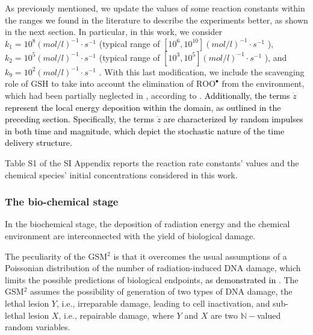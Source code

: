 \documentclass[10pt]{iopart}
\newcommand{\fra}[1]{\textcolor{black}{#1}}
\newcommand{\ema}[1]{\textcolor{black}{#1}}
\numberwithin{table}{section}
\begin{document}
As previously mentioned, we update the values of some reaction constants within the ranges we found in the literature to describe the experiments better, as shown in the next section. In particular, in this work, we consider $k_{1} = 10^8 (mol/l)^{-1} \cdot s^{-1}$ (typical range of $[10^6, 10^{10}] (mol/l)^{-1} \cdot s^{-1}$ \cite{Labarbe2020, Spitz2019, Neta1990, Epp1976, Michael1986}), $k_{2} = 10^5 (mol/l)^{-1} \cdot s^{-1}$ (typical range of $[10^3, 10^5] (mol/l)^{-1} \cdot s^{-1}$ \cite{Labarbe2020, Riahi2010}), and $k_{9} = 10^2 (mol/l)^{-1} \cdot s^{-1}$ \cite{Spitz2019, Wardman2020}. With this last modification, we include the scavenging role of $\mathrm{GSH}$ to take into account the elimination of $\mathrm{ROO^\bullet}$ from the environment, which had been partially neglected in \cite{Labarbe2020}, according to \cite{Wardman2020, Tan2023}. \fra{Additionally, the terms $\dot{z}$ represent the \ema{local} energy deposition within the domain, as outlined in the preceding section. Specifically, the terms $\dot{z}$ are characterized by random impulses in both time and magnitude, which depict the stochastic nature of the time delivery structure.}

Table S1 of the SI Appendix reports the reaction rate constants' values and the chemical species' initial concentrations considered in this work.

\subsubsection*{The bio-chemical stage}

In the biochemical stage, the deposition of radiation energy and the chemical environment are interconnected with the yield of biological damage.

The peculiarity of the GSM$^2$ is that it overcomes the usual assumptions of a Poissonian distribution of the number of radiation-induced DNA damage, which limits the possible predictions of biological endpoints\ema{, as demonstrated in} \cite{missiaggia2022cell}. The GSM$^2$ assumes the possibility of generation of two types of DNA damage, the lethal lesion $Y$, i.e., irreparable damage, leading to cell inactivation, and sub-lethal lesion $X$, i.e., repairable damage, where $Y$ and $X$ are two $\mathbb{N}-$valued random variables.
\end{document}
